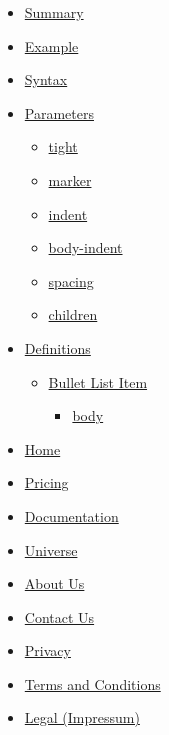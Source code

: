 \begin{itemize}
\tightlist
\item
  \hyperref[summary]{Summary}
\item
  \hyperref[example]{Example}
\item
  \hyperref[syntax]{Syntax}
\item
  \hyperref[parameters]{Parameters}

  \begin{itemize}
  \tightlist
  \item
    \hyperref[parameters-tight]{tight}
  \item
    \hyperref[parameters-marker]{marker}
  \item
    \hyperref[parameters-indent]{indent}
  \item
    \hyperref[parameters-body-indent]{body-indent}
  \item
    \hyperref[parameters-spacing]{spacing}
  \item
    \hyperref[parameters-children]{children}
  \end{itemize}
\item
  \hyperref[definitions]{Definitions}

  \begin{itemize}
  \tightlist
  \item
    \hyperref[definitions-item]{Bullet List Item}

    \begin{itemize}
    \tightlist
    \item
      \hyperref[definitions-item-body]{body}
    \end{itemize}
  \end{itemize}
\end{itemize}

\begin{itemize}
\tightlist
\item
  \href{/}{Home}
\item
  \href{/pricing/}{Pricing}
\item
  \href{/docs/}{Documentation}
\item
  \href{/universe/}{Universe}
\item
  \href{/about/}{About Us}
\item
  \href{/contact/}{Contact Us}
\item
  \href{/privacy/}{Privacy}
\item
  \href{https://typst.app/terms}{Terms and Conditions}
\item
  \href{/legal/}{Legal (Impressum)}
\end{itemize}

